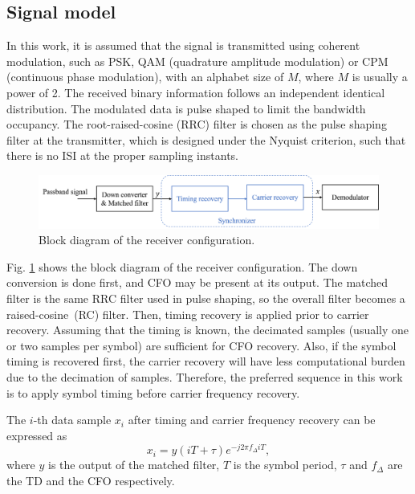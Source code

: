 \documentclass[journal,comsoc, onecolumn, 12pt,draftclsnofoot]{IEEEtran} %
\begin{document}
\subsection{Signal model }  


In this work, it is assumed that the signal is transmitted using coherent modulation, such as PSK, QAM (quadrature amplitude modulation) or CPM (continuous phase modulation), with an alphabet size of \(M\), where \(M\) is usually a power of 2.
The received binary information follows an independent identical distribution.
The modulated data is pulse shaped to limit the bandwidth occupancy.
The root-raised-cosine (RRC) filter is chosen as the pulse shaping filter at the transmitter, which is designed under the Nyquist criterion, 
such that there is no ISI at the proper sampling instants.

\begin{figure}[ht]
\centering
\includegraphics[width=5.5 in]{pic/sys_conf.png}
\caption{Block diagram of the receiver configuration.}
\label{fig:sysconf} 
\end{figure}

Fig. \ref{fig:sysconf} shows the block diagram of the receiver configuration.
The down conversion is done first, and CFO may be present at its output.
The matched filter is the same RRC filter used in pulse shaping, so the overall filter becomes a raised-cosine~(RC) filter. 
Then, timing recovery is applied prior to carrier recovery.
Assuming that the timing is known, the decimated samples (usually one or two samples per symbol) are sufficient for CFO recovery.
Also, if the symbol timing is recovered first, the carrier recovery will have less computational burden due to the decimation of samples.
Therefore, the preferred sequence in this work is to apply symbol timing before carrier frequency recovery.

The $i$-th data sample \(x_i\) after timing and carrier frequency recovery can be expressed as
\begin{equation}
{x_i} = y(iT +  \tau ){e^{ - j2\pi {f_\Delta }iT}},
\end{equation}
% 
% 
where \(y\) is the output of the matched filter, \(T\) is the symbol period, \(\tau\) and \(f_\Delta\) are the TD and the CFO respectively.
\end{document}

